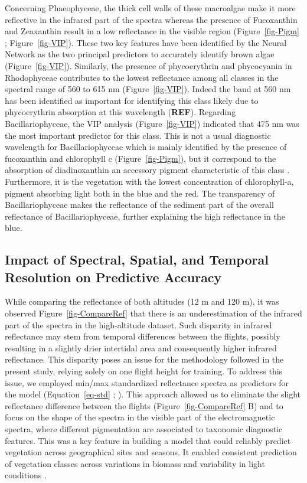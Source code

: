 \documentclass[
  number]{elsarticle}
\begin{document}
Concerning Phaeophyceae, the thick cell walls of these macroalgae
\citep{charrier2021growth} make it more reflective in the infrared part
of the spectra \citep{Slaton2001} whereas the presence of Fucoxanthin
and Zeaxanthin result in a low reflectance in the visible region
(Figure~\ref{fig-Pigm} ; Figure~\ref{fig-VIP}). These two key features
have been identified by the Neural Network as the two principal
predictors to accurately identify brown algae (Figure~\ref{fig-VIP}).
Similarly, the presence of phycoerythrin and phycocyanin in Rhodophyceae
contributes to the lowest reflectance among all classes in the spectral
range of 560 to 615 nm (Figure~\ref{fig-VIP}). Indeed the band at 560 nm
has been identified as important for identifying this class likely due
to phycoerythrin absorption at this wavelength (\textbf{REF}). Regarding
Bacillariophyceae, the VIP analysis (Figure~\ref{fig-VIP}) indicated
that 475 nm was the most important predictor for this class. This is not
a usual diagnostic wavelength for Bacillariophyceae which is mainly
identified by the presence of fucoxanthin and chlorophyll c
(Figure~\ref{fig-Pigm}), but it correspond to the absorption of
diadinoxanthin an accessory pigment characteristic of this class
\citep{meleder2003spectrometric}. Furthermore, it is the vegetation with
the lowest concentration of chlorophyll-a, pigment absorbing light both
in the blue and the red. The transparency of Bacillariophyceae makes the
reflectance of the sediment part of the overall reflectance of
Bacillariophyceae, further explaining the high reflectance in the blue.

\subsection{Impact of Spectral, Spatial, and Temporal Resolution on
Predictive
Accuracy}\label{impact-of-spectral-spatial-and-temporal-resolution-on-predictive-accuracy}

While comparing the reflectance of both altitudes (12 m and 120 m), it
was observed Figure~\ref{fig-CompareRef} that there is an
underestimation of the infrared part of the spectra in the high-altitude
dataset. Such disparity in infrared reflectance may stem from temporal
differences between the flights, possibly resulting in a slightly drier
intertidal area and consequently higher infrared reflectance. This
disparity poses an issue for the methodology followed in the present
study, relying solely on one flight height for training. To address this
issue, we employed min/max standardized reflectance spectra as
predictors for the model (Equation~\ref{eq-std} ; \citep{Cao2017}). This
approach allowed us to eliminate the slight reflectance difference
between the flights (Figure~\ref{fig-CompareRef} B) and to focus on the
shape of the spectra in the visible part of the electromagnetic spectra,
where different pigmentation are associated to taxonomic diagnostic
features. This was a key feature in building a model that could reliably
predict vegetation across geographical sites and seasons. It enabled
consistent prediction of vegetation classes across variations in biomass
and variability in light conditions \citetext{\citealp[
]{fyfe2003spatial}; \citealp[
]{COSTA2021107018}; \citealp{piaser2023impact}}.
\end{document}
